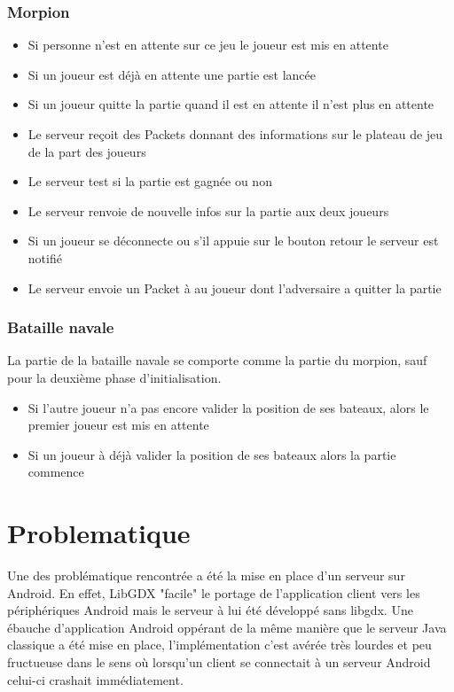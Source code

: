 \documentclass{report}
\begin{document}
\subsection{Morpion}
\begin{itemize}
  \item Si personne n'est en attente sur ce jeu le joueur est mis en attente
  \item Si un joueur est déjà en attente une partie est lancée
  \item Si un joueur quitte la partie quand il est en attente il n'est plus en attente
  \item Le serveur reçoit des Packets donnant des informations sur le plateau de jeu de la part des joueurs
  \item Le serveur test si la partie est gagnée ou non
  \item Le serveur renvoie de nouvelle infos sur la partie aux deux joueurs
  \item Si un joueur se déconnecte ou s'il appuie sur le bouton retour le serveur est notifié
  \item Le serveur envoie un Packet à au joueur dont l'adversaire a quitter la partie
\end{itemize}

\subsection{Bataille navale}
La partie de la bataille navale se comporte comme la partie du morpion, sauf pour la deuxième phase d'initialisation.
\begin{itemize}
  \item Si l'autre joueur n'a pas encore valider la position de ses bateaux, alors le premier joueur est mis en attente
  \item Si un joueur à déjà valider la position de ses bateaux alors la partie commence
\end{itemize}

\chapter{Problematique}
Une des problématique rencontrée a été la mise en place d'un serveur sur Android. En effet, LibGDX "facile" le portage de l'application client vers les
périphériques Android mais le serveur à lui été développé sans libgdx. Une ébauche d'application Android oppérant de la même manière que le serveur Java classique a
été mise en place, l'implémentation c'est avérée très lourdes et peu fructueuse dans le sens où lorsqu'un client se connectait à un serveur Android celui-ci crashait
immédiatement.
\end{document}
